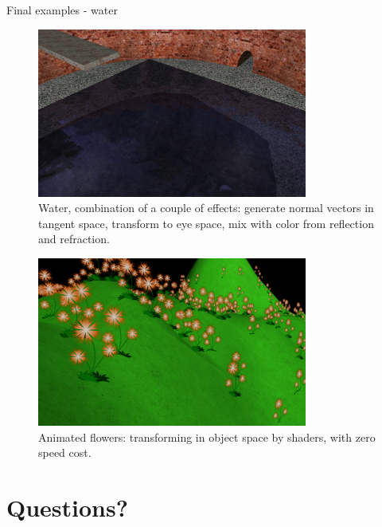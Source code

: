 \documentclass{beamer}
\begin{document}
\begin{frame}{Final examples - water}
\begin{figure}
  \centering
  \includegraphics[width=3.5in]{../water_shaders_3}
  \caption{Water, combination of a couple of effects: generate normal vectors in tangent space, transform to eye space, mix with color from reflection and refraction.}
\end{figure}
\end{frame}

\begin{frame}
\begin{figure}
  \centering
  \includegraphics[width=3.5in]{../flowers}
  \caption{Animated flowers: transforming in object space by shaders, with zero speed cost.}
\end{figure}
\end{frame}

\section{Questions?}
\end{document}

